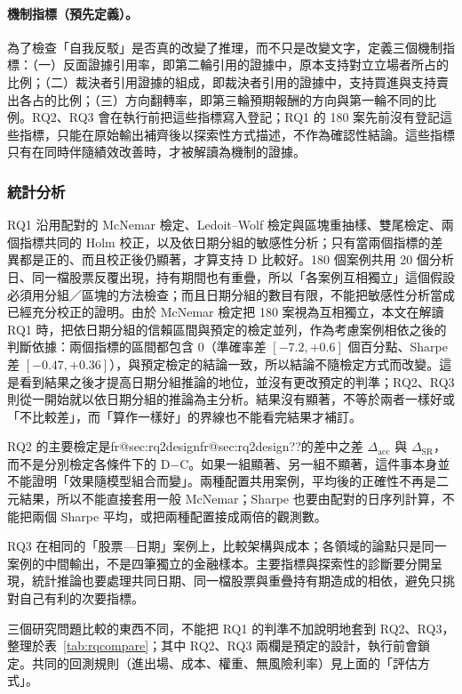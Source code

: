 \documentclass[12pt,a4paper]{article}
\makeatletter
\numberwithin{table}{section}
\numberwithin{figure}{section}
\newcommand{\frref}[1]{\ifcsname fr@#1\endcsname\csname fr@#1\endcsname\else ??\fi}
\makeatother
\begin{document}
\paragraph{機制指標（預先定義）。} 為了檢查「自我反駁」是否真的改變了推理，而不只是改變文字，定義三個機制指標：（一）反面證據引用率，即第二輪引用的證據中，原本支持對立立場者所占的比例；（二）裁決者引用證據的組成，即裁決者引用的證據中，支持買進與支持賣出各占的比例；（三）方向翻轉率，即第三輪預期報酬的方向與第一輪不同的比例。RQ2、RQ3 會在執行前把這些指標寫入登記；RQ1 的 180 案先前沒有登記這些指標，只能在原始輸出補齊後以探索性方式描述，不作為確認性結論。這些指標只有在同時伴隨績效改善時，才被解讀為機制的證據。

\subsubsection{統計分析}

RQ1 沿用配對的 McNemar 檢定、Ledoit--Wolf 檢定與區塊重抽樣、雙尾檢定、兩個指標共同的 Holm 校正，以及依日期分組的敏感性分析；只有當兩個指標的差異都是正的、而且校正後仍顯著，才算支持 D 比較好。180 個案例共用 20 個分析日、同一檔股票反覆出現，持有期間也有重疊，所以「各案例互相獨立」這個假設必須用分組／區塊的方法檢查；而且日期分組的數目有限，不能把敏感性分析當成已經充分校正的證明。由於 McNemar 檢定把 180 案視為互相獨立，本文在解讀 RQ1 時，把依日期分組的信賴區間與預定的檢定並列，作為考慮案例相依之後的判斷依據：兩個指標的區間都包含 0（準確率差 $[-7.2,+0.6]$ 個百分點、Sharpe 差 $[-0.47,+0.36]$），與預定檢定的結論一致，所以結論不隨檢定方式而改變。這是看到結果之後才提高日期分組推論的地位，並沒有更改預定的判準；RQ2、RQ3 則從一開始就以依日期分組的推論為主分析。結果沒有顯著，不等於兩者一樣好或「不比較差」，而「算作一樣好」的界線也不能看完結果才補訂。

RQ2 的主要檢定是\frref{sec:rq2design}的差中之差 $\Delta_{\mathrm{acc}}$ 與 $\Delta_{\mathrm{SR}}$，而不是分別檢定各條件下的 D$-$C。如果一組顯著、另一組不顯著，這件事本身並不能證明「效果隨模型組合而變」。兩種配置共用案例，平均後的正確性不再是二元結果，所以不能直接套用一般 McNemar；Sharpe 也要由配對的日序列計算，不能把兩個 Sharpe 平均，或把兩種配置接成兩倍的觀測數。

RQ3 在相同的「股票—日期」案例上，比較架構與成本；各領域的論點只是同一案例的中間輸出，不是四筆獨立的金融樣本。主要指標與探索性的診斷要分開呈現，統計推論也要處理共同日期、同一檔股票與重疊持有期造成的相依，避免只挑對自己有利的次要指標。

三個研究問題比較的東西不同，不能把 RQ1 的判準不加說明地套到 RQ2、RQ3，整理於表~\ref{tab:rqcompare}；其中 RQ2、RQ3 兩欄是預定的設計，執行前會鎖定。共同的回測規則（進出場、成本、權重、無風險利率）見上面的「評估方式」。
\end{document}
